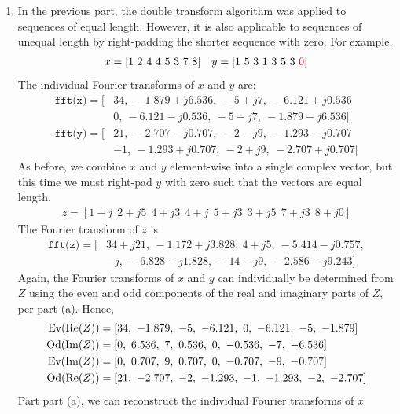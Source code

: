 \documentclass[a4paper, 11pt]{article}
\begin{document}
\begin{enumerate}[label=\alph*)]
    \item In the previous part, the double transform algorithm was applied to
    sequences of equal length. However, it is also applicable to sequences of
    unequal length by right-padding the shorter sequence with zero. For example,
    \begin{align*}
        x = [1\ 2\ 4\ 4\ 5\ 3\ 7\ 8] &&
        y = [1\ 5\ 3\ 1\ 3\ 5\ 3\ \textcolor{red}{0}]
    \end{align*}
    The individual Fourier transforms of $x$ and $y$ are:
    \begin{align*}
        \texttt{fft(x)} = [&34,\ -1.879+j6.536,\ -5+j7,\ -6.121+j0.536 \\
                           &0,\ -6.121-j0.536,\ -5-j7,\ -1.879-j6.536] \\
        \texttt{fft(y)} = [&21,\ -2.707-j0.707,\ -2-j9,\ -1.293-j0.707 \\
                           &-1,\ -1.293+j0.707,\ -2+j9,\ -2.707+j0.707]
    \end{align*}
    As before, we combine $x$ and $y$ element-wise into a single complex vector,
    but this time we must right-pad $y$ with zero such that the vectors are
    equal length.
    \begin{align*}
        z = [1+j\ \ 2+j5\ \ 4+j3\ \ 4+j\ \ 5+j3\ \ 3+j5\ \ 7+j3\ \ 8+j0]
    \end{align*}
    The Fourier transform of $z$ is
    \begin{align*}
        \texttt{fft(z)} = [&34+j21,\ -1.172+j3.828,\ 4+j5,\ -5.414-j0.757,\\
                           &-j,\ -6.828-j1.828,\ -14-j9,\ -2.586-j9.243]
    \end{align*}
    Again, the Fourier transforms of $x$ and $y$ can individually be determined
    from $Z$ using the even and odd components of the real and imaginary parts
    of $Z$, per part (a). Hence,
    \begin{align*}
        \Ev(\Re(Z)) &= [34,\ -1.879,\ -5,\ -6.121,\ 0,\ -6.121,\ -5,\ -1.879] \\
        \Od(\Im(Z)) &= [0,\ 6.536,\ 7,\ 0.536,\ 0,\ -0.536,\ -7,\ -6.536] \\
        \Ev(\Im(Z)) &= [0,\ 0.707,\ 9,\ 0.707,\ 0,\ -0.707,\ -9,\ -0.707] \\
        \Od(\Re(Z)) &= [21,\ -2.707,\ -2,\ -1.293,\ -1,\ -1.293,\ -2,\ -2.707]
    \end{align*}
    Part part (a), we can reconstruct the individual Fourier transforms of $x$

\end{enumerate}
\end{document}
